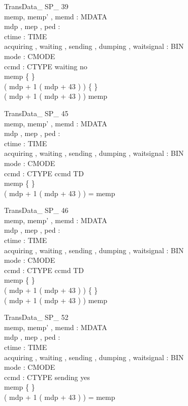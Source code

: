 \begin{schema}{TransData\_ SP\_ 39}\\
 memp, memp' , memd : \seq MDATA \\
 mdp , mep , ped : \nat \\
 ctime : TIME \\
 acquiring , waiting , sending , dumping , waitsignal : BIN \\
 mode : CMODE \\
 ccmd : CTYPE 
\where
 waiting \neq no \\
 memp \neq \{ \} \\
 ( mdp + 1 \upto ( mdp + 43 ) ) \neq \{ \} \\
 ( mdp + 1 \upto ( mdp + 43 ) ) \subset \dom memp
\end{schema}

\begin{schema}{TransData\_ SP\_ 45}\\
 memp, memp' , memd : \seq MDATA \\
 mdp , mep , ped : \nat \\
 ctime : TIME \\
 acquiring , waiting , sending , dumping , waitsignal : BIN \\
 mode : CMODE \\
 ccmd : CTYPE 
\where
 ccmd \neq TD \\
 memp \neq \{ \} \\
 ( mdp + 1 \upto ( mdp + 43 ) ) = \dom memp
\end{schema}


\begin{schema}{TransData\_ SP\_ 46}\\
 memp, memp' , memd : \seq MDATA \\
 mdp , mep , ped : \nat \\
 ctime : TIME \\
 acquiring , waiting , sending , dumping , waitsignal : BIN \\
 mode : CMODE \\
 ccmd : CTYPE 
\where
 ccmd \neq TD \\
 memp \neq \{ \} \\
 ( mdp + 1 \upto ( mdp + 43 ) ) \neq \{ \} \\
 ( mdp + 1 \upto ( mdp + 43 ) ) \subset \dom memp
\end{schema}

\begin{schema}{TransData\_ SP\_ 52}\\
 memp, memp' , memd : \seq MDATA \\
 mdp , mep , ped : \nat \\
 ctime : TIME \\
 acquiring , waiting , sending , dumping , waitsignal : BIN \\
 mode : CMODE \\
 ccmd : CTYPE 
\where
 sending \neq yes \\
 memp \neq \{ \} \\
 ( mdp + 1 \upto ( mdp + 43 ) ) = \dom memp
\end{schema}


